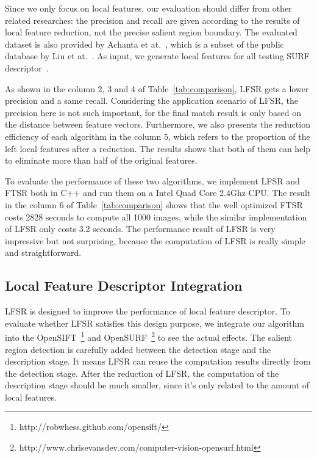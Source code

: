 Since we only focus on local features, our evaluation should differ from other related researches: the precision and recall are given according to the results of local feature reduction, not the precise salient region boundary. The evaluated dataset is also provided by Achanta et at.~\cite{achanta2009frequency}, which is a subset of the public database by Liu et at.~\cite{liu2011learning}. As input, we generate local features for all testing SURF descriptor~\cite{evans2010opensurf}. 

As shown in the column 2, 3 and 4 of Table~\ref{tab:comparison}, LFSR gets a lower precision and a same recall. Considering the application scenario of LFSR, the precision here is not such important, for the final match result is only based on the distance between feature vectors. Furthermore, we also presents the reduction efficiency of each algorithm in the column 5, which refers to the proportion of the left local features after a reduction. The results shows that both of them can help to eliminate more than half of the original features.

To evaluate the performance of these two algorithms, we implement LFSR and FTSR both in C++ and run them on a Intel Quad Core 2.4Ghz CPU. The result in the column 6 of Table~\ref{tab:comparison} shows that the well optimized FTSR costs 2828 seconds to compute all 1000 images, while the similar implementation of LFSR only costs 3.2 seconds. The performance result of LFSR is very impressive but not surprising, because the computation of LFSR is really simple and straightforward.

\subsection{Local Feature Descriptor Integration}
\label{sec:evaluation_integration}

LFSR is designed to improve the performance of local feature descriptor. To evaluate whether LFSR satisfies this design purpose, we integrate our algorithm into the OpenSIFT~\footnote{http://robwhess.github.com/opensift/} and OpenSURF~\footnote{http://www.chrisevansdev.com/computer-vision-opensurf.html} to see the actual effects. The salient region detection is carefully added between the detection stage and the description stage. It means LFSR can reuse the computation results directly from the detection stage. After the reduction of LFSR, the computation of the description stage should be much smaller, since it's only related to the amount of local features.

